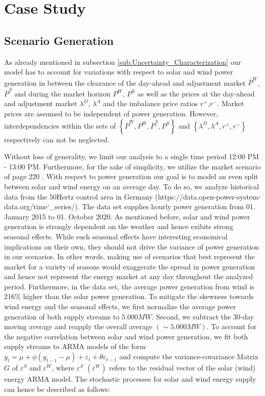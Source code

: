 \section{Case Study}

\subsection{Scenario Generation}
As already mentioned in subsection \ref{sub:Uncertainty_Characterization} our model has to account for variations with respect to solar and wind power generation in between the clearance of the day-ahead and adjustment market $\overline{P}^{W}$,$\overline{P}^{S}$ and during the market horizon ${P}^{W}$, ${P}^{S}$ as well as the prices at the day-ahead and adjustment market $\lambda^D$, $\lambda^A$ and the imbalance price ratios $r^+$,$r^-$. Market prices are assumed to be independent of power generation. However, interdependencies within the sets of $\left\lbrace\overline{P}^{W},{P}^{W},\overline{P}^{S},{P}^{S}\right\rbrace$ and $\left\lbrace\lambda^D,\lambda^A,r^+,r^-\right\rbrace$ respectively can not be neglected. 


Without loss of generality, we limit our analysis to a single time period 12:00 PM - 13:00 PM. Furthermore, for the sake of simplicity, we utilize the market scenario of page 220 \cite{Conejo10}. %
With respect to power generation our goal is to model an even split between solar and wind energy on an average day. To do so, we analyze historical data from the 50Hertz control area in Germany (https://data.open-power-system-data.org/time\char`_series/). The data set supplies hourly power generation from 01. January 2015 to 01. October 2020. As mentioned before, solar and wind power generation is strongly dependent on the weather and hence exibits strong seasonal effects. While such seasonal effects have interesting economical implications on their own, they should not drive the variance of power generation in our scenarios. In other words, making use of scenarios that best represent the market for a variety of seasons would exaggerate the spread in power generation and hence not represent the energy market at any day throughout the analyzed period. Furthermore, in the data set, the average power generation from wind is 216\% higher than the solar power generation. To mitigate the skewness towards wind energy and the seasonal effects, we first normalize the average power generation of both supply streams to $5.000 MW$. Second, we subtract the 30-day moving average and reapply the overall average $\left(\sim 5.000 MW\right)$. To account for the negative correlation between solar and wind power generation, we fit both supply streams to ARMA models of the form $y_t = \mu + \phi \left(y_{t-1}-\mu\right)+\varepsilon_t + \theta\varepsilon_{t-1}$ and compute the variance-covariance Matrix $G$ of $\varepsilon^S$ and $\varepsilon^W$, where $\varepsilon^S$ $\left(\varepsilon^W\right)$ refers to the residual vector of the solar (wind) energy ARMA model. The stochastic processes 
for solar and wind energy supply can hence be described as follows:

